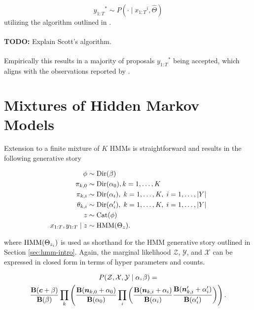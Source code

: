\documentclass[12pt]{report}
\newcommand{\p}[0]{\prime}
\newcommand{\1}[0]{\mathbbm{1}}
\newcommand{\Cat}[0]{\textnormal{Cat}}
\newcommand{\Dir}[0]{\textnormal{Dir}}
\newcommand{\HMM}[0]{\textnormal{HMM}}
\newcommand{\Bf}[0]{\text{\textbf{B}}}
\newcommand{\seq}[3]{\ensuremath{#1_{{#2}:{#3}}}}
\DeclarePairedDelimiter\abs{\lvert}{\rvert}%
\begin{document}
\[
    \seq{y}{1}{T}^* \sim P(\cdot \mid \seq{x}{1}{T}^i, \hat{\Theta})
\]
utilizing the algorithm outlined in \cite{scott-bayesian-hmm}.
\\\\
\textbf{TODO:} Explain Scott's algorithm.
\\\\
Empirically this results in a majority of proposals $\seq{y}{1}{T}^*$ being accepted, which aligns
with the observations reported by \cite{hmm-comparison-johnson}.

\section{Mixtures of Hidden Markov Models}\label{sec:mohmms}
Extension to a finite mixture of $K$ \acp{HMM} is straightforward and results
in the following generative story

\begin{align*}
    \phi & \sim \Dir(\beta) \\
    \pi_{k,0} & \sim \Dir(\alpha_0), k=1,\ldots,K \\
    \pi_{k,i} & \sim \Dir(\alpha_i),\; k=1,\ldots,K,\; i=1,\ldots,\abs{Y} \\
    \theta_{k,i} & \sim \Dir(\alpha_i^\p),\; k=1,\ldots,K,\; i = 1,\ldots,\abs{Y} \\
    z & \sim \Cat(\phi) \\
    \seq{x}{1}{T}, \seq{y}{1}{T} \mid z & \sim \HMM(\Theta_z).
\end{align*}

where $\HMM(\Theta_{z_i})$ is used as shorthand for the \ac{HMM}
generative story outlined in Section \ref{sec:hmm-intro}. Again, the marginal likelihood
$\mathcal{Z}$, $\mathcal{Y}$, and $\mathcal{X}$ can be expressed in closed form in terms of 
hyper parameters and counts.

\begin{multline}
    P(\mathcal{Z}, \mathcal{X}, \mathcal{Y} \mid \alpha, \beta) = \\
    \frac{\Bf(\bm{c} + \beta)}{\Bf(\beta)}
    \prod_k
    \left(
        \frac{\Bf(\bm{n}_{k,0} + \alpha_0)}{\Bf(\alpha_0)} 
        \prod_i 
        \left(
            \frac{\Bf(\bm{n}_{k,i} + \alpha_i)}{\Bf(\alpha_i)} 
            \frac{\Bf(\bm{n}_{k,i}^\p + \alpha_i^\p)}{\Bf(\alpha_i^\p)}
        \right)
    \right). \label{eq:joint-marg-finite-mixture}
\end{multline}
\end{document}

